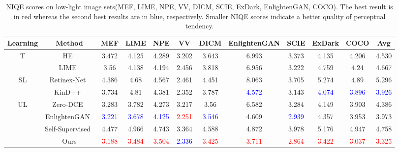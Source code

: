 \documentclass[journal]{IEEEtran}
\begin{document}
\begin{table*}[t]
\centering
\caption{NIQE scores on low-light image sets(MEF, LIME, NPE, VV, DICM, SCIE, ExDark, EnlightenGAN, COCO). The best result is in red whereas the second best results are in blue, respectively. Smaller NIQE scores indicate a better quality of perceptual tendency.}
\begin{tabular}{c|c|c|c|c|c|c|c|c|c|c|c}
\hline
\textbf{Learning} &\textbf{Method} &MEF &LIME &NPE &VV &DICM &EnlightenGAN &SCIE &ExDark &COCO &Avg\\ \hline
\multirow{2}{*}{T}
&HE~\cite{pizer1990contrast} &3.472 &4.125 &4.289 &3.202 &3.643 &6.993 &3.373 &4.135 &4.206 &4.530\\ 
&LIME~\cite{guo2016lime} &3.56 &4.138 &4.194 &2.456 &3.818 &6.956 &3.222 &4.759 &4.24 &4.667\\ \hline
\multirow{2}{*}{SL}
&Retinex-Net~\cite{Chen2018Retinex} &4.386 &4.68 &4.567 &2.461 &4.451 &8.063 &3.705 &5.274 &4.89 &5.296\\ 
&KinD++~\cite{zhang2021beyond} &3.734 &4.81 &4.381 &2.352 &3.787 &{\textcolor{blue}{4.572}} &3.143 &{\textcolor{blue}{4.074}} &{\textcolor{blue}{3.896}} &{\textcolor{blue}{3.926}}\\ \hline
\multirow{4}{*}{UL}
&Zero-DCE~\cite{guo2020zero} &3.283 &3.782 &4.273 &3.217 &3.56 &6.582 &3.284 &4.149 &3.903 &4.386\\ 
&EnlightenGAN~\cite{jiang2021enlightengan} &{\textcolor{blue}{3.221}} &{\textcolor{blue}{3.678}} &{\textcolor{blue}{4.125}} &{\textcolor{red}{2.251}} &{\textcolor{blue}{3.546}} &4.609 &{\textcolor{blue}{2.939}} &4.357 &3.953 &3.973\\
&Self-Supervised~\cite{zhang2020self} &4.477 &4.966 &4.743 &3.364 &4.588 &4.872 &3.978 &5.176 &4.947 &4.758\\ 
&Ours &{\textcolor{red}{3.188}} &{\textcolor{red}{3.484}} &{\textcolor{red}{3.504}} &{\textcolor{blue}{2.336}} &{\textcolor{red}{3.425}} &{\textcolor{red}{3.711}} &{\textcolor{red}{2.864}} &{\textcolor{red}{3.422}} &{\textcolor{red}{3.037}} &{\textcolor{red}{3.325}}\\ \hline
\end{tabular}
\label{table:real}
\end{table*}
\end{document}
